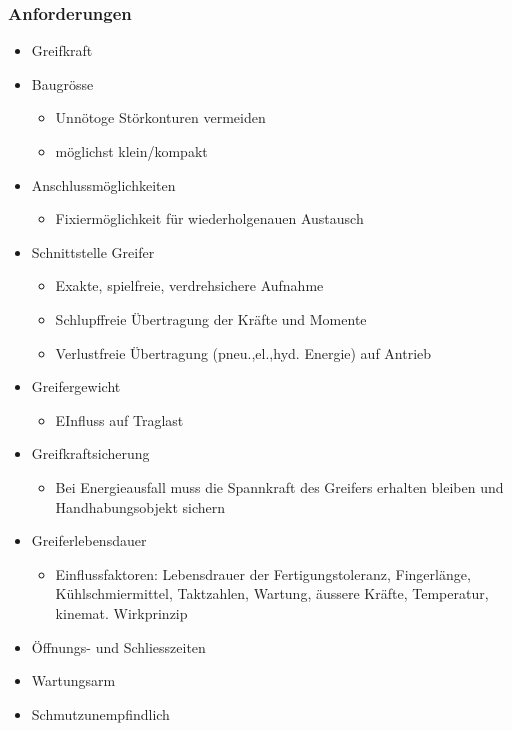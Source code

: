 \begin{multicols}{2}
    \subsubsection{Anforderungen}
    \begin{itemize}
        \item Greifkraft
        \item Baugrösse
        \begin{itemize}
            \item Unnötoge Störkonturen vermeiden
            \item möglichst klein/kompakt
        \end{itemize}
        \item Anschlussmöglichkeiten
        \begin{itemize}
            \item Fixiermöglichkeit für wiederholgenauen Austausch
        \end{itemize}
        \item Schnittstelle Greifer
        \begin{itemize}
            \item Exakte, spielfreie, verdrehsichere Aufnahme
            \item Schlupffreie Übertragung der Kräfte und Momente
            \item Verlustfreie Übertragung (pneu.,el.,hyd. Energie) auf Antrieb
        \end{itemize}
        \item Greifergewicht
        \begin{itemize}
            \item EInfluss auf Traglast
        \end{itemize}
        \item Greifkraftsicherung
        \begin{itemize}
            \item Bei Energieausfall muss die Spannkraft des Greifers erhalten bleiben und Handhabungsobjekt sichern
        \end{itemize}
        \item Greiferlebensdauer
        \begin{itemize}
            \item Einflussfaktoren: Lebensdrauer der Fertigungstoleranz, Fingerlänge, Kühlschmiermittel, Taktzahlen, Wartung, äussere Kräfte, Temperatur, kinemat. Wirkprinzip
        \end{itemize}
        \item Öffnungs- und Schliesszeiten
        \item Wartungsarm
        \item Schmutzunempfindlich    
    \end{itemize}
\end{multicols}
